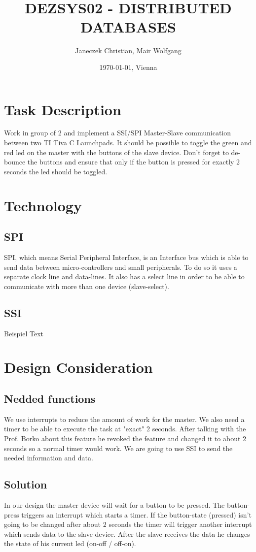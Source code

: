 \documentclass[11pt,a4paper]{article}
\title{\bf DEZSYS02 - DISTRIBUTED DATABASES}
\author{Janeczek Christian, Mair Wolfgang}
\affil{IT Department TGM, Vienna}
\date{\today{}, Vienna}
\begin{document}
\maketitle
\newpage
\tableofcontents
\newpage

\section{Task Description}
Work in group of 2 and implement a SSI/SPI Master-Slave communication between two TI Tiva C Launchpads. It should be possible to toggle the green and red led on the master with the buttons of the slave device. Don't forget to de-bounce the buttons and ensure that only if the button is pressed for exactly 2 seconds the led should be toggled.\cite{SPI_SSI}


\section{Technology}
\subsection{SPI}
SPI, which means Serial Peripheral Interface, is an Interface bus which is able to send data between micro-controllers and small peripherals. To do so it uses a separate clock line and data-lines. It also has a select line in order to be able to communicate with more than one device (slave-select).\cite{SPI_expl}


\subsection{SSI}
Beispiel Text
\newpage

\section{Design Consideration}
\subsection{Nedded functions}
We use interrupts to reduce the amount of work for the master. We also need a timer to be able to execute the task at "exact" 2 seconds. After talking with the Prof. Borko about this feature he revoked the feature and changed it to about 2 seconds so a normal timer would work. We are going to use SSI to send the needed information and data.
\subsection{Solution}
In our design the master device will wait for a button to be pressed. The button-press triggers an interrupt which starts a timer. If the button-state (pressed) isn't going to be changed after about 2 seconds the timer will trigger another interrupt which sends data to the slave-device. After the slave receives the data he changes the state of his current led (on-off / off-on).
\end{document}
